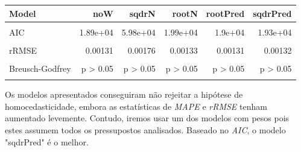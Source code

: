 \documentclass[justified, 11pt]{scrartcl}\usepackage[]{graphicx}\usepackage[]{xcolor}
\newenvironment{knitrout}{}{} %
\begin{document}
\begin{knitrout}
\begin{table}
\begin{tabular}{l|r|r|r|r|r}
\hline
Model & noW & sqdrN & rootN & rootPred & sqdrPred\\
\hline
\cellcolor{gray!6}{R2} & \cellcolor{gray!6}{0.412} & \cellcolor{gray!6}{0.929} & \cellcolor{gray!6}{0.374} & \cellcolor{gray!6}{0.421} & \cellcolor{gray!6}{0.449}\\
\hline
AIC & 1.89e+04 & 5.98e+04 & 1.99e+04 & 1.9e+04 & 1.93e+04\\
\hline
\cellcolor{gray!6}{MAPE} & \cellcolor{gray!6}{0.085} & \cellcolor{gray!6}{0.129} & \cellcolor{gray!6}{0.0869} & \cellcolor{gray!6}{0.085} & \cellcolor{gray!6}{0.0854}\\
\hline
rRMSE & 0.00131 & 0.00176 & 0.00133 & 0.00131 & 0.00132\\
\hline
\cellcolor{gray!6}{Breusch-Pagan} & \cellcolor{gray!6}{p = 6.11e-124} & \cellcolor{gray!6}{p > 0.05} & \cellcolor{gray!6}{p > 0.05} & \cellcolor{gray!6}{p = 1.12e-63} & \cellcolor{gray!6}{p = 0.0488}\\
\hline
Breusch-Godfrey & p > 0.05 & p > 0.05 & p > 0.05 & p > 0.05 & p > 0.05\\
\hline
\cellcolor{gray!6}{Jarque-Bera} & \cellcolor{gray!6}{p < 0.05} & \cellcolor{gray!6}{p < 0.05} & \cellcolor{gray!6}{p < 0.05} & \cellcolor{gray!6}{p < 0.05} & \cellcolor{gray!6}{p < 0.05}\\
\hline
\end{tabular}
\endgroup{}
\end{table}

\end{knitrout}

Os modelos apresentados conseguiram não rejeitar a hipótese de homocedasticidade, embora as estatísticas de \textit{MAPE} e \textit{rRMSE} tenham aumentado levemente. Contudo, iremos usar um dos modelos com pesos pois estes assumem todos os pressupostos analisados. Baseado no \textit{AIC}, o modelo "sqdrPred" é o melhor.\\
\end{document}
